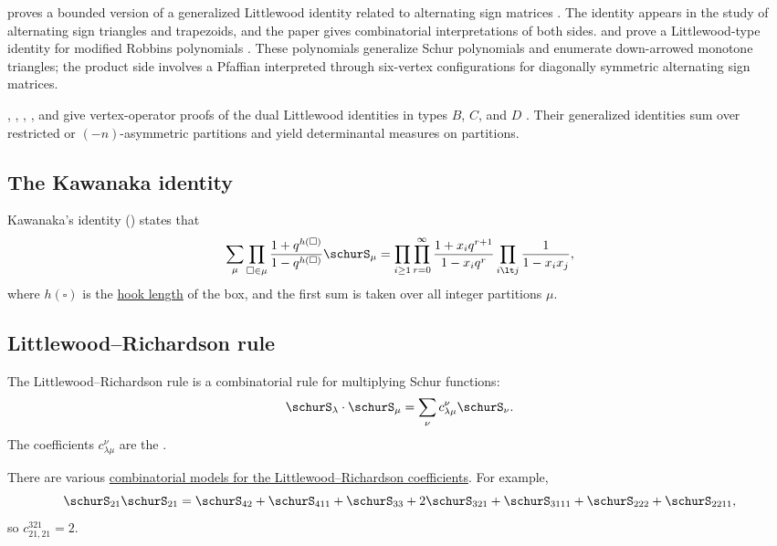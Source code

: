  proves a bounded version of a generalized Littlewood
identity related to alternating sign matrices \cite{Fischer2024}.  The identity
appears in the study of alternating sign triangles and trapezoids, and the
paper gives combinatorial interpretations of both sides.
 and  prove a Littlewood-type
identity for modified Robbins polynomials \cite{FischerHongesberg2025x}.
These polynomials generalize Schur polynomials and enumerate down-arrowed
monotone triangles; the product side involves a Pfaffian interpreted through
six-vertex configurations for diagonally symmetric alternating sign matrices.

, , ,
, and  give vertex-operator proofs of the
dual Littlewood identities in types $B$, $C$, and $D$
\cite{CaiJiangJingLiYe2026x}.  Their generalized identities sum over
restricted or $(-n)$-asymmetric partitions and yield determinantal measures
on partitions.


\subsection[schurKawanaka]{The Kawanaka identity}

Kawanaka's identity (\cite{Kawanaka1999}) states that
\begin{equation}
  \sum_{\mu} \prod_{\square \in \mu}
  \frac{ 1+q^{h(\square)} }{ 1-q^{h(\square)} }
    \schurS_\mu
  =  \prod_{i \geq 1} \prod_{r=0}^{\infty} \frac{ 1+x_i q^{r+1} }{ 1- x_i q^{r} } \prod_{i \lt j} \frac{1}{1-x_i x_j},
\end{equation}
where $h(\square)$ is the \hyperref[partitionCores]{hook length} of the box,
and the first sum is taken over all integer partitions $\mu$.


\subsection[schurLittlewoodRichardson]{Littlewood--Richardson rule}

The Littlewood--Richardson rule is a combinatorial rule for multiplying Schur functions:
\[
\schurS_{\lambda} \cdot \schurS_{\mu} = \sum_{\nu} c^{\nu}_{\lambda\mu} \schurS_{\nu}.
\]
The coefficients $c^{\nu}_{\lambda\mu}$ are the
\label{littlewoodRichardsonCoefficient}.

There are various \hyperref[littlewoodRichardsonModels]{combinatorial models for the Littlewood--Richardson coefficients}.
For example,
\[
\schurS_{21}\schurS_{21}
=\schurS_{42}+\schurS_{411}+\schurS_{33}+2\schurS_{321}
+\schurS_{3111}+\schurS_{222}+\schurS_{2211},
\]
so $c^{321}_{21,21}=2$.

